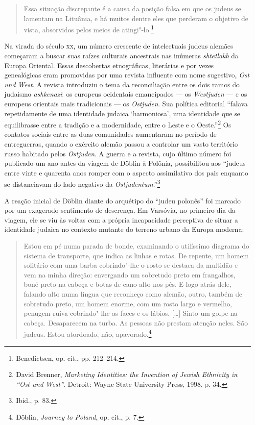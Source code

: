 \begin{quote}
Essa situação discrepante é a causa da posição falsa em que os judeus se
lamentam na Lituânia, e há muitos dentre eles que perderam o objetivo de
vista, absorvidos pelos meios de atingi"-lo.\footnote{Benedictsen, op. cit., pp. 212--214.} 
\end{quote}

Na virada do século \textsc{xx}, um número crescente de intelectuais judeus
alemães começaram a buscar suas raízes culturais ancestrais nas inúmeras
\textit{shtetlakh} da Europa Oriental. Essas descobertas etnográficas,
literárias e por vezes genealógicas eram promovidas por uma revista
influente com nome sugestivo, \textit{Ost und West}. A revista introduziu
o tema da reconciliação entre os dois ramos do judaísmo \textit{ashkenazi}: os
europeus ocidentais emancipados --- os \textit{Westjuden} --- e os europeus
orientais mais tradicionais --- os \textit{Ostjuden}. Sua política editorial
``falava repetidamente de uma identidade judaica `harmoniosa', uma
identidade que se equilibrasse entre a tradição e a modernidade, entre o
Leste e o Oeste.''\footnote{David Brenner, \textit{Marketing Identities: the Invention of Jewish Ethnicity in ``Ost und West''}. Detroit: Wayne State University Press, 1998, p. 34.} Os contatos sociais entre as duas comunidades aumentaram no período de entreguerras, quando o
exército alemão passou a controlar um vasto território russo habitado
pelos \textit{Ostjuden}. A guerra e a revista, cujo último número foi
publicado um ano antes da viagem de Döblin à Polônia, possibilitou aos
``judeus entre vinte e quarenta anos romper com o aspecto assimilativo
dos pais enquanto se distanciavam do lado negativo da
\textit{Ostjudentum}.''\footnote{Ibid., p. 83.}

A reação inicial de Döblin diante do arquétipo do ``judeu polonês'' foi
marcado por um exagerado sentimento de descrença. Em Varsóvia, no
primeiro dia da viagem, ele se viu às voltas com a própria incapacidade
perceptiva de situar a identidade judaica no contexto mutante do terreno
urbano da Europa moderna:

\begin{quote}
Estou em pé numa parada de bonde, examinando o utilíssimo diagrama do
sistema de transporte, que indica as linhas e rotas. De repente, um
homem solitário com uma barba cobrindo"-lhe o rosto se destaca da
multidão e vem na minha direção: envergando um sobretudo preto em
frangalhos, boné preto na cabeça e botas de cano alto nos pés. E logo
atrás dele, falando alto numa língua que reconheço como alemão, outro,
também de sobretudo preto, um homem enorme, com um rosto largo e
vermelho, penugem ruiva cobrindo"-lhe as faces e os lábios. [\ldots{}]
Sinto um golpe na cabeça. Desaparecem na turba. As pessoas não prestam
atenção neles. São judeus. Estou atordoado, não, apavorado.\footnote{Döblin, \textit{Journey to Poland}, op. cit., p. 7.} 
\end{quote}


